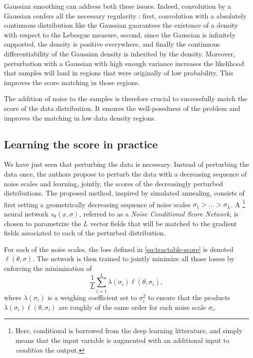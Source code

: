 \documentclass[11pt,twoside]{article}
\theoremstyle{definition}
\begin{document}
Gaussian smoothing can address both these issues. Indeed, convolution by a Gaussian confers all the necessary regularity : first, convolution with a absolutely continuous distribution like the Gaussian guarantees the existence of a density with respect to the Lebesgue measure, second, since the Gaussian is infinitely supported, the density is positive everywhere, and finally the continuous differentiability of the Gaussian density is inherited by the density. Moreover, perturbation with a Gaussian with high enough variance increases the likelihood that samples will land in regions that were originally of low probability. This improves the score matching in those regions.

The addition of noise to the samples is therefore crucial to successfully match the score of the data distribution. It ensures the well-posedness of the problem and improves the matching in low data density regions.

\subsection{Learning the score in practice}

We have just seen that perturbing the data is necessary. Instead of perturbing the data once, the authors propose to perturb the data with a decreasing sequence of noise scales and learning, jointly, the scores of the decreasingly perturbed distributions. The proposed method, inspired by simulated annealing, consists of first setting a geometrically decreasing sequence of noise scales $\sigma_1 > \dots > \sigma_L$. A \footnote{Here, conditional is borrowed from the deep learning litterature, and simply means that the input variable is augmented with an additional input to \textit{condition} the output.} neural network $s_\theta(x, \sigma)$, referred to as a \textit{Noise Conditional Score Network}, is chosen to parametrize the $L$  vector fields that will be matched to the gradient fields associated to each of the perturbed distribution.

For each of the noise scales, the loss defined in \eqref{eq:tractable-score} is denoted $\ell(\theta, \sigma)$. The network is then trained to jointly minimize all those losses by enforcing the minimization of
\[
\frac{1}{L} \sum_{i=1}^{L}\lambda(\sigma_i) \ell(\theta, \sigma_i),
\]
where $\lambda(\sigma_i)$ is a weighing coefficient set to $\sigma_i^2$ to ensure that the products \(\lambda(\sigma_i) \ell(\theta, \sigma_i)\) are roughly of the same order for each noise scale $\sigma_i$. 
\end{document}
